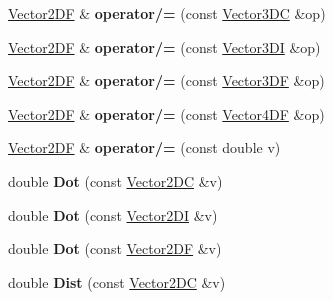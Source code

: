 \begin{DoxyCompactItemize}
\item 
\hypertarget{class_vector2_d_f_a7d412f88636bb5f33d94a763d9f1fe90}{\hyperlink{class_vector2_d_f}{Vector2\+D\+F} \& {\bfseries operator/=} (const \hyperlink{class_vector3_d_c}{Vector3\+D\+C} \&op)}\label{class_vector2_d_f_a7d412f88636bb5f33d94a763d9f1fe90}

\item 
\hypertarget{class_vector2_d_f_a1ab987061fc041adec492f2cd113fbce}{\hyperlink{class_vector2_d_f}{Vector2\+D\+F} \& {\bfseries operator/=} (const \hyperlink{class_vector3_d_i}{Vector3\+D\+I} \&op)}\label{class_vector2_d_f_a1ab987061fc041adec492f2cd113fbce}

\item 
\hypertarget{class_vector2_d_f_a235ca68629c3bdcd9a329a701f29eb74}{\hyperlink{class_vector2_d_f}{Vector2\+D\+F} \& {\bfseries operator/=} (const \hyperlink{class_vector3_d_f}{Vector3\+D\+F} \&op)}\label{class_vector2_d_f_a235ca68629c3bdcd9a329a701f29eb74}

\item 
\hypertarget{class_vector2_d_f_ae15d89add09cbc6691fc0bf4a7f9f2c6}{\hyperlink{class_vector2_d_f}{Vector2\+D\+F} \& {\bfseries operator/=} (const \hyperlink{class_vector4_d_f}{Vector4\+D\+F} \&op)}\label{class_vector2_d_f_ae15d89add09cbc6691fc0bf4a7f9f2c6}

\item 
\hypertarget{class_vector2_d_f_a56a7dd14686983ba8a3885cbf616c571}{\hyperlink{class_vector2_d_f}{Vector2\+D\+F} \& {\bfseries operator/=} (const double v)}\label{class_vector2_d_f_a56a7dd14686983ba8a3885cbf616c571}

\item 
\hypertarget{class_vector2_d_f_a6165e7ebc3675614d7de24b208b72c68}{double {\bfseries Dot} (const \hyperlink{class_vector2_d_c}{Vector2\+D\+C} \&v)}\label{class_vector2_d_f_a6165e7ebc3675614d7de24b208b72c68}

\item 
\hypertarget{class_vector2_d_f_aa9a0e9f2423e09364b9e6302ae233606}{double {\bfseries Dot} (const \hyperlink{class_vector2_d_i}{Vector2\+D\+I} \&v)}\label{class_vector2_d_f_aa9a0e9f2423e09364b9e6302ae233606}

\item 
\hypertarget{class_vector2_d_f_ae86a4291ce87429f133ec8edaa6ad0ea}{double {\bfseries Dot} (const \hyperlink{class_vector2_d_f}{Vector2\+D\+F} \&v)}\label{class_vector2_d_f_ae86a4291ce87429f133ec8edaa6ad0ea}

\item 
\hypertarget{class_vector2_d_f_a412c0c8ff5db581b3a20c2001d7f99d3}{double {\bfseries Dist} (const \hyperlink{class_vector2_d_c}{Vector2\+D\+C} \&v)}\label{class_vector2_d_f_a412c0c8ff5db581b3a20c2001d7f99d3}


\end{DoxyCompactItemize}
